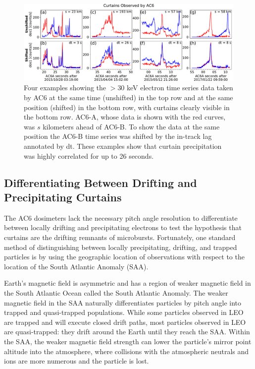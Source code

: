 \documentclass[draft]{agujournal2019}
\begin{document}
\begin{figure}
\includegraphics[width=\textwidth]{fig1.pdf}
\caption{Four examples showing the $>30$ keV electron time series data taken by AC6 at the same time (unshifted) in the top row and at the same position (shifted) in the bottom row, with curtains clearly visible in the bottom row. AC6-A, whose data is shown with the red curves, was $s$ kilometers ahead of AC6-B. To show the data at the same position the AC6-B time series was shifted by the in-track lag annotated by dt. These examples show that curtain precipitation was highly correlated for up to 26 seconds.}
\label{fig1}
\end{figure}

\subsection{Differentiating Between Drifting and Precipitating Curtains} \label{blc_methodology}

The AC6 dosimeters lack the necessary pitch angle resolution to differentiate between locally drifting and precipitating electrons to test the  hypothesis that curtains are the drifting remnants of microbursts. Fortunately, one standard method of distinguishing between locally precipitating, drifting, and trapped particles is by using the geographic location of observations with respect to the location of the South Atlantic Anomaly (SAA).

Earth's magnetic field is asymmetric and has a region of weaker magnetic field in the South Atlantic Ocean called the South Atlantic Anomaly. The weaker magnetic field in the SAA naturally differentiates particles by pitch angle into trapped and quasi-trapped populations. While some particles observed in LEO are trapped and will execute closed drift paths, most particles observed in LEO are quasi-trapped: they drift around the Earth until they reach the SAA. Within the SAA, the weaker magnetic field strength can lower the particle's mirror point altitude into the atmosphere, where collisions with the atmospheric neutrals and ions are more numerous and the particle is lost. 
\end{document}
